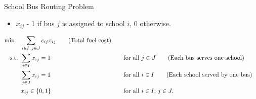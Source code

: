 \begin{examplewithallcode}{School Bus Routing Problem}
\begin{itemize}
    \item \(x_{ij} \) - 1 if bus \(j\) is assigned to school \(i\), 0 otherwise.
\end{itemize}

\begin{align*}
\min \quad & \sum_{i \in I,\, j \in J} c_{ij} x_{ij}   \tag{Total fuel cost} \\
\mbox{ s.t. }        & \sum_{i \in I} x_{ij} = 1 &&\quad \mbox{for all } j \in J   \tag{Each bus serves one school} \\
             & \sum_{j \in J} x_{ij} = 1 &&\quad \mbox{for all } i \in I   \tag{Each school served by one bus} \\
             & x_{ij} \in \{0,1\} &&\quad \mbox{for all } i \in I,\, j \in J.
\end{align*}
\end{examplewithallcode}

